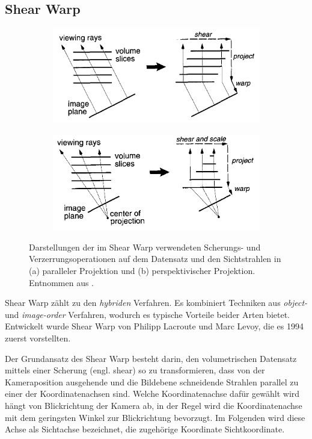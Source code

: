 \documentclass[a4paper,fontsize=12pt,toc=bib,parskip=half,ngerman]{scrartcl}
\begin{document}
\subsection{Shear Warp}
\begin{figure}
	\centering
	\begin{subfigure}{0.49\textwidth}
		\includegraphics[width=\textwidth]{pictures/ShearWarp1}
		\caption{}
		\label{ShearWarp1}
	\end{subfigure}
	\hfill
	\begin{subfigure}{0.49\textwidth}
		\includegraphics[width=\textwidth]{pictures/ShearWarp2}
		\caption{}
		\label{ShearWarp2}
	\end{subfigure}
	\caption{Darstellungen der im Shear Warp verwendeten Scherungs- und Verzerrungsoperationen auf dem Datensatz und den Sichtstrahlen in (a) paralleler Projektion und (b) perspektivischer Projektion. Entnommen aus \cite{lacroute1994fast}.}
\end{figure}
Shear Warp z\"ahlt zu den \textit{hybriden} Verfahren. Es kombiniert Techniken aus \textit{object-} und \textit{image-order} Verfahren, wodurch es typische Vorteile beider Arten bietet. Entwickelt wurde Shear Warp von Philipp Lacroute und Marc Levoy, die es 1994 zuerst vorstellten\cite{lacroute1994fast}. 

Der Grundansatz des Shear Warp besteht darin, den volumetrischen Datensatz mittels einer Scherung (engl. \glq shear\grq{}) so zu transformieren, dass von der Kameraposition ausgehende und die Bildebene schneidende Strahlen parallel zu einer der Koordinatenachsen sind. Welche Koordinatenachse daf\"ur gew\"ahlt wird h\"angt von Blickrichtung der Kamera ab, in der Regel wird die Koordinatenachse mit dem geringsten Winkel zur Blickrichtung bevorzugt. Im Folgenden wird diese Achse als \glq Sichtachse\grq{} bezeichnet, die zugeh\"orige Koordinate \glq Sichtkoordinate\grq{}. 
\end{document}
